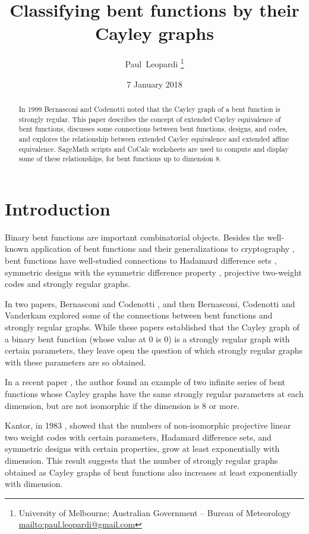 \documentclass[12pt,a4paper]{article}
\title{Classifying bent functions by their Cayley graphs}
\author{
Paul~Leopardi
\thanks{University of Melbourne; Australian Government -- Bureau of Meteorology
\protect\url{mailto:paul.leopardi@gmail.com}}
}
\date{7 January 2018}
\begin{document}
\maketitle

\begin{abstract}
%
In 1999 Bernasconi and Codenotti noted that the Cayley graph of a bent function is strongly regular.
This paper describes the concept of extended Cayley equivalence of bent functions,
discusses some connections between bent functions, designs, and codes,
and explores the relationship between extended Cayley equivalence and extended affine equivalence.
SageMath scripts and CoCalc worksheets are used to compute and display some of these relationships,
for bent functions up to dimension 8.
%
\end{abstract}

\section{Introduction}
\label{sec-Introduction}
Binary bent functions are important combinatorial objects.
Besides the well-known application of bent functions and their generalizations to cryptography
\cite{Ada97} \cite[4.1-4.6]{Tok15bent},
bent functions have well-studied connections to Hadamard difference sets \cite{Dil74},
symmetric designs with the symmetric difference property \cite{DilS87block,Kan75symplectic},
projective two-weight codes \cite{DinD15class} and strongly regular graphs.

In two papers, Bernasconi and Codenotti \cite{BerC99}, and then Bernasconi, Codenotti and Vanderkam
\cite{BerCV01} explored some of the connections
between bent functions and strongly regular graphs.
While these papers established that the Cayley graph of a binary bent function (whose value at 0 is
0) is a strongly regular graph
with certain parameters, they leave open the question of which strongly regular graphs with these
parameters are so obtained.

In a recent paper \cite{Leo17Hurwitz},
the author found an example of two infinite series of bent functions whose
Cayley graphs have the same strongly regular parameters at each dimension,
but are not isomorphic if the dimension is 8 or more.

Kantor, in 1983 \cite{Kan83exponential}, showed that the numbers of non-isomorphic projective linear
two weight codes with certain parameters,
Hadamard difference sets, and symmetric designs with certain properties, grow at least exponentially
with dimension.
This result suggests that the number of strongly regular graphs obtained as Cayley graphs of bent
functions also increases at least exponentially with dimension.
\end{document}
